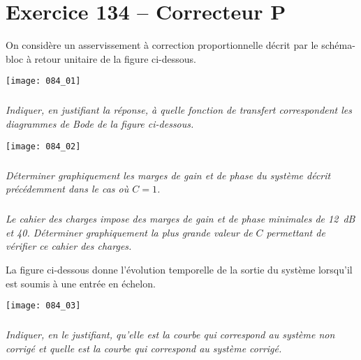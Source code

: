 \section*{Exercice 134 -- Correcteur P}
\setcounter{exo}{0}
On considère un asservissement à correction proportionnelle décrit par le schéma-bloc à retour unitaire de la
figure ci-dessous.

\begin{center}
\texttt{[image: 084\_01]}
\end{center}



\subparagraph{}
\textit{Indiquer, en justifiant la réponse, à quelle fonction de transfert correspondent les diagrammes de
Bode de la figure ci-dessous.}
\ifprof
\begin{corrige}
\end{corrige}
\else
\fi

\begin{center}
\texttt{[image: 084\_02]}
\end{center}


\subparagraph{}
\textit{Déterminer graphiquement les marges de gain et de phase du système décrit précédemment dans le
cas où $C=1$.}
\ifprof
\begin{corrige}
\end{corrige}
\else
\fi


\subparagraph{}
\textit{Le cahier des charges impose des marges de gain et de phase minimales de \SI{12}{dB} et \SI{40}{\degres}. Déterminer graphiquement la plus grande valeur de $C$ permettant de vérifier ce cahier des charges.}
\ifprof
\begin{corrige}
\end{corrige}
\else
\fi

La figure ci-dessous donne l’évolution temporelle de la sortie du système lorsqu’il est soumis à une entrée
en échelon.

\begin{center}
\texttt{[image: 084\_03]}
\end{center}

\subparagraph{}
\textit{Indiquer, en le justifiant, qu’elle est la courbe qui correspond au système non corrigé et quelle est la
courbe qui correspond au système corrigé.}
\ifprof
\begin{corrige}
\end{corrige}
\else
\fi

